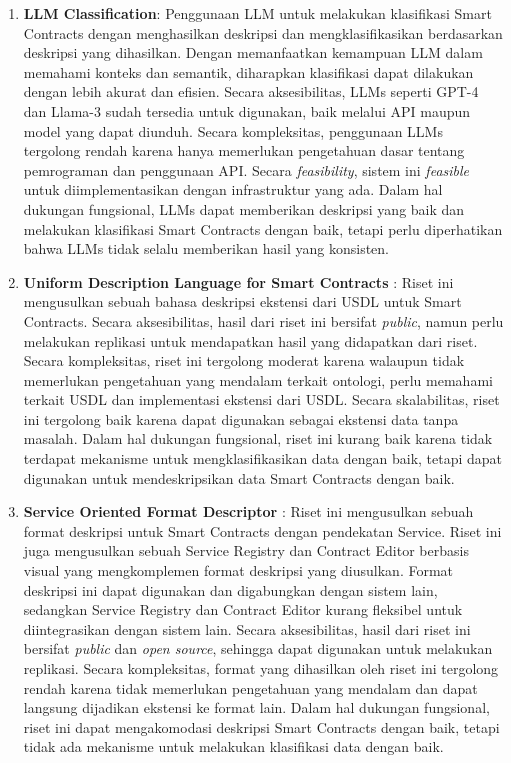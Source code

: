 \begin{enumerate}
	\item \textbf{LLM Classification}: Penggunaan LLM untuk melakukan klasifikasi Smart Contracts dengan menghasilkan deskripsi dan mengklasifikasikan berdasarkan deskripsi yang dihasilkan. Dengan memanfaatkan kemampuan LLM dalam memahami konteks dan semantik, diharapkan klasifikasi dapat dilakukan dengan lebih akurat dan efisien. Secara aksesibilitas, LLMs seperti GPT-4 dan Llama-3 sudah tersedia untuk digunakan, baik melalui API maupun model yang dapat diunduh. Secara kompleksitas, penggunaan LLMs tergolong rendah karena hanya memerlukan pengetahuan dasar tentang pemrograman dan penggunaan API. Secara \textit{feasibility}, sistem ini \textit{feasible} untuk diimplementasikan dengan infrastruktur yang ada. Dalam hal dukungan fungsional, LLMs dapat memberikan deskripsi yang baik dan melakukan klasifikasi Smart Contracts dengan baik, tetapi perlu diperhatikan bahwa LLMs tidak selalu memberikan hasil yang konsisten.

	\item \textbf{Uniform Description Language for Smart Contracts} \parencite{udlsc}: Riset ini mengusulkan sebuah bahasa deskripsi ekstensi dari USDL untuk Smart Contracts. Secara aksesibilitas, hasil dari riset ini bersifat \textit{public}, namun perlu melakukan replikasi untuk mendapatkan hasil yang didapatkan dari riset. Secara kompleksitas, riset ini tergolong moderat karena walaupun tidak memerlukan pengetahuan yang mendalam terkait ontologi, perlu memahami terkait USDL dan implementasi ekstensi dari USDL. Secara skalabilitas, riset ini tergolong baik karena dapat digunakan sebagai ekstensi data tanpa masalah. Dalam hal dukungan fungsional, riset ini kurang baik karena tidak terdapat mekanisme untuk mengklasifikasikan data dengan baik, tetapi dapat digunakan untuk mendeskripsikan data Smart Contracts dengan baik.

	\item \textbf{Service Oriented Format Descriptor} \parencite{guida2019supporting}: Riset ini mengusulkan sebuah format deskripsi untuk Smart Contracts dengan pendekatan Service. Riset ini juga mengusulkan sebuah Service Registry dan Contract Editor berbasis visual yang mengkomplemen format deskripsi yang diusulkan. Format deskripsi ini dapat digunakan dan digabungkan dengan sistem lain, sedangkan Service Registry dan Contract Editor kurang fleksibel untuk diintegrasikan dengan sistem lain. Secara aksesibilitas, hasil dari riset ini bersifat \textit{public} dan \textit{open source}, sehingga dapat digunakan untuk melakukan replikasi. Secara kompleksitas, format yang dihasilkan oleh riset ini tergolong rendah karena tidak memerlukan pengetahuan yang mendalam dan dapat langsung dijadikan ekstensi ke format lain. Dalam hal dukungan fungsional, riset ini dapat mengakomodasi deskripsi Smart Contracts dengan baik, tetapi tidak ada mekanisme untuk melakukan klasifikasi data dengan baik.


\end{enumerate}

